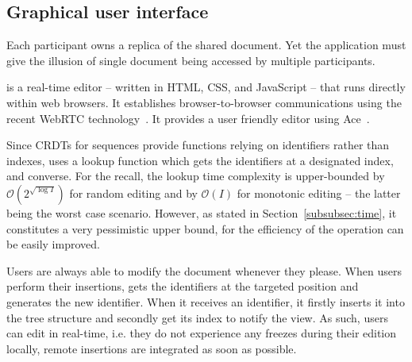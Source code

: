 \subsection{Graphical user interface}

Each participant owns a replica of the shared document. Yet the application must
give the illusion of single document being accessed by multiple
participants.

\CRATE is a real-time editor -- written in HTML, CSS, and JavaScript -- that
runs directly within web browsers. It establishes browser-to-browser
communications using the recent WebRTC technology~\cite{webrtc}. It provides a
user friendly editor using Ace~\cite{ace}.


Since CRDTs for sequences provide functions relying on identifiers rather than
indexes, \CRATE uses a lookup function which gets the identifiers at a
designated index, and converse. For the recall, the lookup time complexity is
upper-bounded by $\mathcal{O}(2^{\sqrt{\log I}})$ for random editing and by
$\mathcal{O}(I)$ for monotonic editing -- the latter being the worst case
scenario. However, as stated in Section~\ref{subsubsec:time}, it constitutes a
very pessimistic upper bound, for the efficiency of the operation can be easily
improved.

Users are always able to modify the document whenever they please.  When users
perform their insertions, \CRATE gets the identifiers at the targeted position
and generates the new identifier. When it receives an identifier, it firstly
inserts it into the tree structure and secondly get its index to notify the
view. As such, users can edit in real-time, i.e. they do not experience any
freezes during their edition locally, remote insertions are integrated as soon
as possible.



